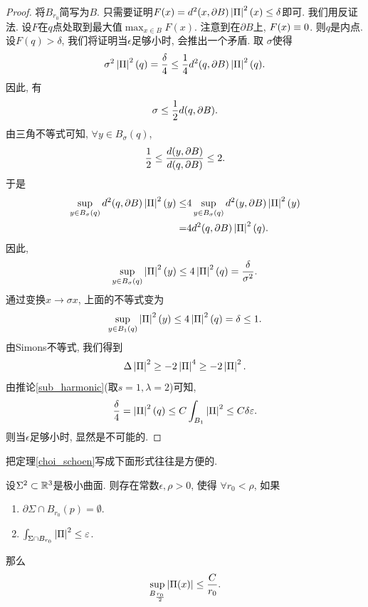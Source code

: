 \begin{proof}
    将$B_{r_0}$简写为$B$. 只需要证明$F(x)=d^2(x,\P B)\abs{\II}^2(x) \le \delta$即可. 我们用反证法. 设$F$在$q$点处取到最大值$\max_{x \in B}F(x)$. 注意到在$\partial B$上, $F(x) \eq 0$. 则$q$是内点.  设$F(q) > \delta$, 我们将证明当$\epsilon$足够小时, 会推出一个矛盾. 取 $\sigma$使得
    \begin{equation}
        \sigma^2\abs{\II}^2(q)=\frac{\delta}{4} \le \frac{1}{4} d^2(q,\P B)\abs{\II}^2(q).
    \end{equation}
    因此, 有
    \begin{equation}
        \sigma \le \frac{1}{2}d(q,\P B).
    \end{equation}
    由三角不等式可知,  $\forall y \in B_\sigma(q)$,
    \begin{equation}
        \frac{1}{2} \le \frac{d(y,\P B)}{d(q,\P B)} \le 2.
    \end{equation}
    于是
    \begin{equation}
        \begin{split}
            \sup_{y\in B_\sigma(q)} d^2(q,\P B) \abs{\II}^2(y) \le &4\sup_{y\in B_\sigma(q)}d^2(y,\P B)\abs{\II}^2(y) \\
            =& 4d^2(q,\P B) \abs{\II}^2(q).
        \end{split}
    \end{equation}
    因此,
    \begin{equation}
        \sup_{y \in B_\sigma(q)} \abs{\II}^2(y) \le 4\abs{\II}^2(q)=\frac{\delta}{\sigma^2}.
    \end{equation}
    通过变换$x\to \sigma x$, 上面的不等式变为
    \begin{equation} \label{ii_sup}
        \sup_{y \in B_1(q)} \abs{\II}^2(y) \le 4\abs{\II}^2(q)=\delta \le 1.
    \end{equation}
    由Simons不等式, 我们得到
    \begin{equation}
        \Delta \abs{\II}^2 \ge -2\abs{\II}^4 \ge -2 \abs{\II}^2.
    \end{equation}
    由推论\eqref{sub_harmonic}(取$s=1,\lambda=2$)可知,
    \begin{equation}
        \frac{\delta}{4}=\abs{\II}^2(q) \le C \int_{B_1} \abs{\II}^2 \le C\delta\epsilon.
    \end{equation}
    则当$\epsilon$足够小时, 显然是不可能的.
\end{proof}
把定理\eqref{choi_schoen}写成下面形式往往是方便的.
\begin{theorem*}\label{choi_schoen_cor}
    设$\Sigma^2 \subset \R^3$是极小曲面.  则存在常数$\epsilon, \rho>0$, 使得 $\forall r_0 < \rho$, 如果
    \begin{enumerate}
        \item $\partial \Sigma \cap B_{r_0}(p)=\emptyset$.
        \item $\int_{\Sigma \cap B_{r_0}} \abs{\II}^2\le \epsilon$.
    \end{enumerate}
    那么
    \begin{equation}
        \mathop{\sup}_{B_{\frac{r_0}{2}}}\abs{\II(x)} \le \frac{C}{r_0}.
    \end{equation}
\end{theorem*}

